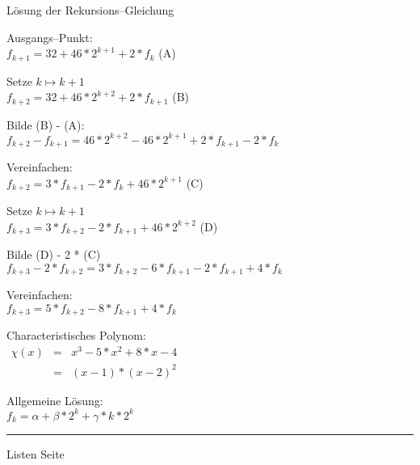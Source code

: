 
\begin{slide}{}
\normalsize

\begin{center}
L\"osung der Rekursions--Gleichung 
\end{center}
\vspace*{0.5cm}

\footnotesize
Ausgangs--Punkt: \\[0.3cm]
\hspace*{1.3cm} $f_{k+1} = 32 + 46 * 2^{k+1} + 2 * f_k$ \hspace*{\fill} (A) 

Setze $k \mapsto k + 1$ \\[0.3cm]
\hspace*{1.3cm} $f_{k+2} = 32 + 46 * 2^{k+2} + 2 * f_{k+1}$ \hspace*{\fill} (B) 

Bilde (B) - (A): \\[0.3cm]
\hspace*{1.3cm} $f_{k+2} - f_{k+1} = 46*2^{k+2} - 46*2^{k+1} + 2 * f_{k+1} - 2 * f_k$

Vereinfachen: \\[0.3cm]
\hspace*{1.3cm} $f_{k+2} = 3 * f_{k+1} - 2 * f_k + 46*2^{k+1}$ \hspace*{\fill} (C)

Setze $k \mapsto k + 1$ \\[0.3cm]
\hspace*{1.3cm}  $f_{k+3} = 3 * f_{k+2} - 2 * f_{k+1} + 46*2^{k+2}$ \hspace*{\fill} (D)

Bilde (D) - 2 * (C) \\[0.3cm]
\hspace*{1.3cm} $f_{k+3} - 2 * f_{k+2} = 3 * f_{k+2} - 6 * f_{k+1} - 2 * f_{k+1} + 4 * f_k$

Vereinfachen:\\[0.3cm]
\hspace*{1.3cm} $f_{k+3} = 5 * f_{k+2} - 8 * f_{k+1} + 4 * f_k$

Characteristisches Polynom: \\[0.3cm]
\hspace*{1.3cm} $\begin{array}{lcl}
                \chi(x) & = & x^3 - 5 * x^2 + 8 * x - 4 \\[0.3cm]
                        & = & (x - 1) * (x - 2)^2 
                \end{array}$


Allgemeine L\"osung: \\[0.3cm]
\hspace*{1.3cm} $f_k = \alpha + \beta * 2^k + \gamma * k * 2^k$


\vspace*{\fill}
\tiny \addtocounter{mypage}{1}
\rule{17cm}{1mm}
Listen  \hspace*{\fill} Seite 
\end{slide}

